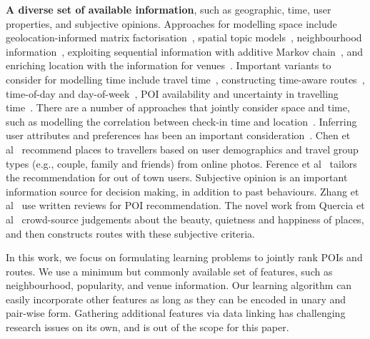 {\bf A diverse set of available information},
such as geographic, time, user properties, and subjective opinions.
Approaches for modelling space include geolocation-informed matrix factorisation~\cite{lian2014geomf}, spatial topic models~\cite{hu2013spatialtopic}, neighbourhood information~\cite{liu2014exploiting}, exploiting sequential information with additive Markov chain~\cite{zhang2014lore}, and enriching location with the information for venues~\cite{deveaud2014importance,deveaud2015experiments}.
Important variants to consider for modelling time include travel time~\cite{gao2013temporal},
constructing time-aware routes~\cite{yuan2013timeaware,hsieh2014mining}, time-of-day and day-of-week~\cite{chen2015tripplanner}, POI availability and uncertainty in travelling time~\cite{zhang2015personalized}. There are a number of approaches that jointly consider space and time\cite{yuan2014graph,zhang2015location}, such as modelling the correlation between check-in time and location~\cite{gao2013temporal}.
Inferring user attributes and preferences has been an important consideration~\cite{liu2013personalized}.
Chen et al~\cite{chen2013people} recommend places to travellers based on 
user demographics
and travel group types (e.g., couple, family and friends) from online photos.
Ference et al~\cite{ference2013location} tailors the recommendation for out of town users.
Subjective opinion is an important information source for decision making, in addition to past behaviours. Zhang et al~\cite{Zhang2015OOP} use written reviews for POI recommendation.
The novel work from Quercia et al~\cite{ht14} crowd-source judgements about the beauty, quietness and happiness of places, and then constructs routes with these subjective criteria.

In this work, we focus on formulating learning problems to jointly rank POIs and routes. We use a minimum but commonly available set of features, such as neighbourhood, popularity, and venue information. Our learning algorithm can easily incorporate other features as long as they can be encoded in unary and pair-wise form. 
Gathering additional features via data linking %
has challenging research issues on its own, and is out of the scope for this paper.

